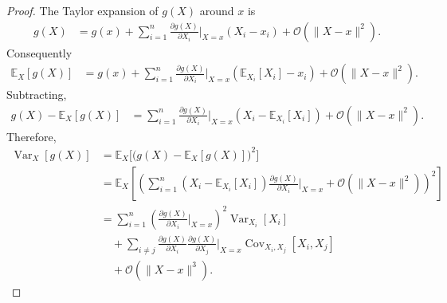 \begin{proof}
	The Taylor expansion of $g(X)$ around $x$ is
	\begin{equation}
		\begin{split}
			g(X)
			&=
			g(x)
			+
			\sum_{i=1}^n
			\frac{\partial g(X)}{\partial X_i}
			\bigg|_{X=x}
			(X_i-x_i)+
			\mathcal{O}(\|X-x\|^2).
		\end{split}
	\end{equation}
	Consequently
	\begin{equation}
		\begin{split}
			\mathbb{E}_X[g(X)]
			&=
			g(x)
			+
			\sum_{i=1}^n
			\frac{\partial g(X)}{\partial X_i}
			\bigg|_{X=x}
			(\mathbb{E}_{X_i}[X_i]-x_i)+
			\mathcal{O}(\|X-x\|^2).
		\end{split}
	\end{equation}
	Subtracting,
	\begin{equation}
		\begin{split}
			g(X)-\mathbb{E}_X[g(X)]
			&=
			\sum_{i=1}^n
			\frac{\partial g(X)}{\partial X_i}
			\bigg|_{X=x}
			(X_i-\mathbb{E}_{X_i}[X_i])+
			\mathcal{O}(\|X-x\|^2).
		\end{split}
	\end{equation}
	Therefore,
	\begin{equation}
		\begin{split}
			\operatorname{Var}_X[g(X)]
			&=
			\mathbb{E}_X
			\bigg[\bigg(
			g(X)-\mathbb{E}_X[g(X)]
			\bigg)^2
			\bigg]\\
			&=
			\mathbb{E}_X
			\!\left[
			\left(
			\sum_{i=1}^n
			(X_i-\mathbb{E}_{X_i}[X_i])
			\frac{\partial g(X)}{\partial X_i}
			\bigg|_{X=x}
			+
			\mathcal{O}(\|X-x\|^2)
			\right)^2
			\right]
			\\
			&=
			\sum_{i=1}^n
			\left(
			\frac{\partial g(X)}{\partial X_i}
			\bigg|_{X=x}
			\right)^2
			\operatorname{Var}_{X_i}[X_i]
			\\
			&\quad+
			\sum_{i\neq j}
			\frac{\partial g(X)}{\partial X_i}
			\frac{\partial g(X)}{\partial X_j}
			\bigg|_{X=x}
			\operatorname{Cov}_{X_i,X_j}[X_i,X_j]
			\\
			&\quad+
			\mathcal{O}(\|X-x\|^3).
		\end{split}
	\end{equation}
\end{proof}

